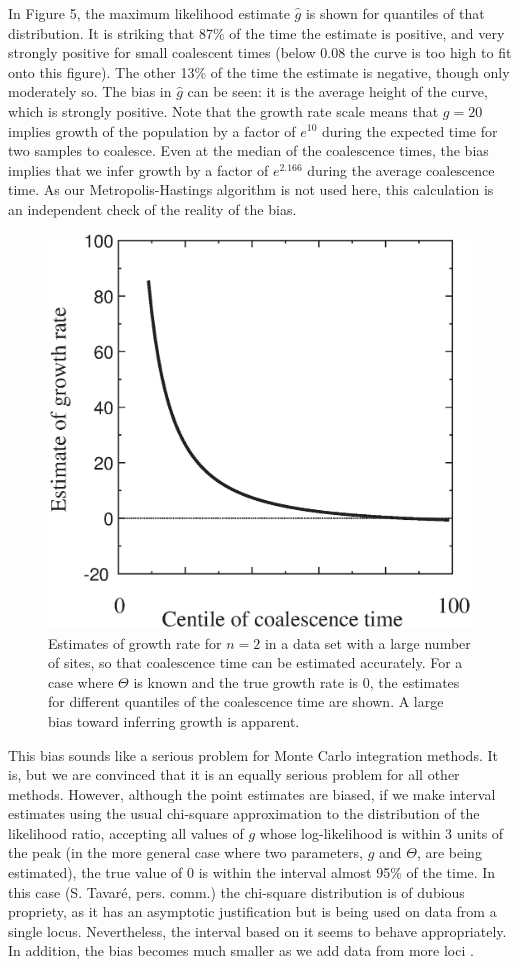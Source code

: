 In Figure 5, the maximum likelihood estimate $\hat{g}$ is shown for
quantiles of that distribution.  It is striking that 87\% of the time
the estimate is positive, and very strongly positive for small
coalescent times (below 0.08 the curve is too high to fit onto this
figure).  The other 13\% of the time the estimate is negative,
though only moderately so.  The bias in $\hat{g}$ can be seen: it is the
average height of the curve, which is strongly positive.  Note that the
growth rate scale means that $g=20$ implies growth of the population
by a factor of $e^{10}$ during the expected time for two samples to
coalesce.  Even at the median of the coalescence times, the bias implies
that we infer growth by a factor of $e^{2.166}$ during the average coalescence
time.  As our Metropolis-Hastings algorithm is not used here, this calculation
is an independent check of the reality of the bias.
\begin{figure} %
\centerline{\includegraphics[width=4.5in]{fig5.ps}}
\caption{Estimates of growth rate for $n=2$ in a data set with a large number of sites,
so that coalescence time can be estimated accurately.  For a case where
$\Theta$ is known and the true growth rate is 0, the estimates for
different quantiles of the coalescence time are shown.  A large bias toward
inferring growth is apparent.}
\end{figure}

This bias sounds like a serious problem for Monte Carlo integration
methods.  It is, but we are convinced that it is an equally serious
problem for all other methods.  However, although the point estimates
are biased, if we make interval estimates using the usual chi-square
approximation to the distribution of the likelihood ratio, accepting
all values of $g$ whose log-likelihood is within 3 units of the peak
(in the more general case where two parameters, $g$ and $\Theta$, are being
estimated), the true value
of 0 is within the interval almost 95\% of the time.  
In this case (S. Tavar\'e, pers. comm.) the chi-square distribution is of
dubious propriety, as it has an asymptotic justification but is being used on
data from a single locus.  Nevertheless, the interval based on it seems to
behave appropriately.  In addition,
the bias becomes much smaller as we add data from more loci \cite{Kuhner98}.


